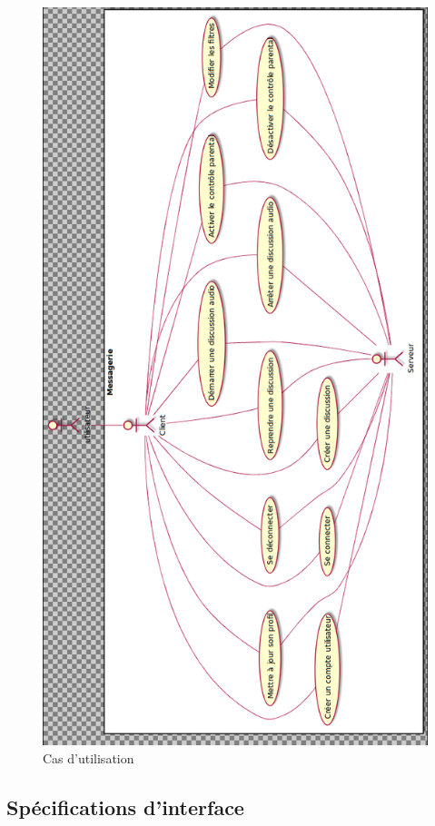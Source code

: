 	\begin{figure}[!h]
		\centering \includegraphics[scale=0.46]{img/usecase.png}
		\caption{Cas d'utilisation}
	\end{figure}


\subsection{Spécifications d’interface}

